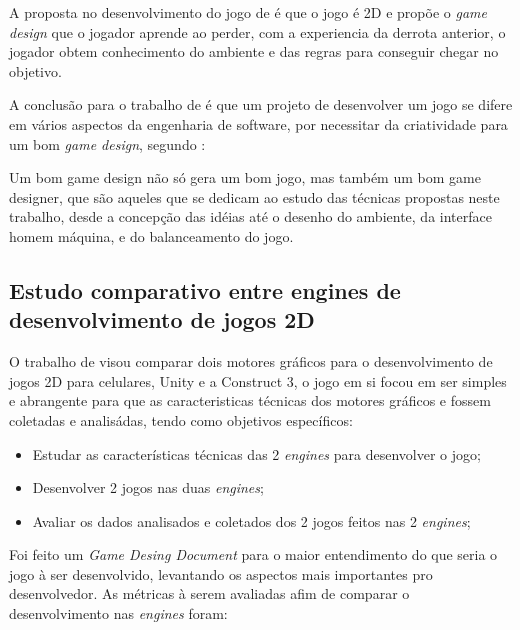 A proposta no desenvolvimento do jogo de \cite{morais2009jogos} é que o jogo é 2D e propõe o \textit{game design} que o jogador aprende ao perder,
com a experiencia da derrota anterior, o jogador obtem conhecimento do ambiente e das regras para conseguir chegar no objetivo.

A conclusão para o trabalho de \cite{morais2009jogos} é que um projeto de desenvolver um jogo se difere em vários aspectos da engenharia de software, por 
necessitar da criatividade para um bom \textit{game design}, segundo \cite{morais2009jogos}:
\begin{citacao}
	Um bom game design não só gera um bom jogo, mas também 
	um bom game designer, que são aqueles que se 
	dedicam ao estudo das técnicas propostas neste 
	trabalho, desde a concepção das idéias até o 
	desenho do ambiente, da interface homem máquina, e do balanceamento do jogo.
\end{citacao}

\subsection{Estudo comparativo entre engines de desenvolvimento de jogos 2D}

O trabalho de \cite{Alves2020} visou comparar dois motores gráficos para o desenvolvimento de jogos 2D para celulares, Unity e a Construct 3,
o jogo em si focou em ser simples e abrangente para que as caracteristicas técnicas dos motores gráficos e fossem coletadas e analisádas, tendo como objetivos específicos:
\begin{itemize}
	\item Estudar as características técnicas das 2 \textit{engines} para desenvolver o jogo;
	\item Desenvolver 2 jogos nas duas \textit{engines};
	\item Avaliar os dados analisados e coletados dos 2 jogos feitos nas 2 \textit{engines};
\end{itemize}

Foi feito um \textit{Game Desing Document} para o maior entendimento do que seria o jogo 
à ser desenvolvido, levantando os aspectos mais importantes pro desenvolvedor.
As métricas à serem avaliadas afim de comparar o desenvolvimento nas \textit{engines} foram: 


